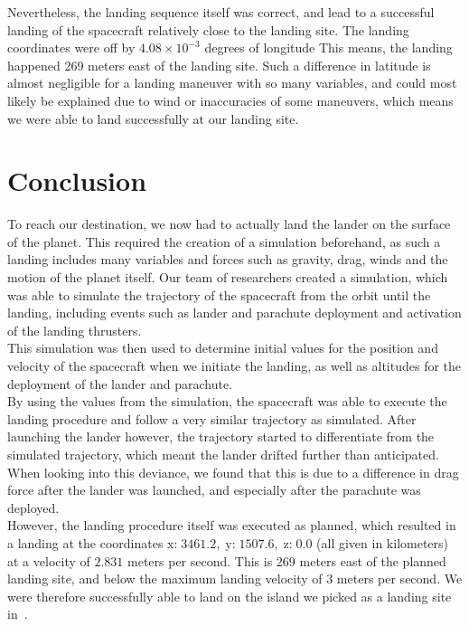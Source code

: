 \documentclass[reprint,english,notitlepage]{revtex4-2}
\begin{document}
Nevertheless, the landing sequence itself was correct, and lead to a successful landing of the spacecraft relatively close to the landing site.
The landing coordinates were off by $4.08 \times 10^{-3}$ degrees of longitude
This means, the landing happened 269 meters east of the landing site.
Such a difference in latitude is almost negligible for a landing maneuver with so many variables, and could most likely be explained due to wind or inaccuracies of some maneuvers, which means we were able to land successfully at our landing site.


\section{Conclusion} \label{sec:conclusion}
To reach our destination, we now had to actually land the lander on the surface of the planet.
This required the creation of a simulation beforehand, as such a landing includes many variables and forces such as gravity, drag, winds and the motion of the planet itself.
Our team of researchers created a simulation, which was able to simulate the trajectory of the spacecraft from the orbit until the landing, including events such as lander and parachute deployment and activation of the landing thrusters.\\

This simulation was then used to determine initial values for the position and velocity of the spacecraft when we initiate the landing, as well as altitudes for the deployment of the lander and parachute.\\

By using the values from the simulation, the spacecraft was able to execute the landing procedure and follow a very similar trajectory as simulated.
After launching the lander however, the trajectory started to differentiate from the simulated trajectory, which meant the lander drifted further than anticipated.
When looking into this deviance, we found that this is due to a difference in drag force after the lander was launched, and especially after the parachute was deployed.\\

However, the landing procedure itself was executed as planned, which resulted in a landing at the coordinates $\text{x:} \;3461.2, \;\text{y:} \;1507.6, \;\text{z:} \;0.0$ (all given in kilometers) at a velocity of $2.831$ meters per second.
This is 269 meters east of the planned landing site, and below the maximum landing velocity of 3 meters per second.
We were therefore successfully able to land on the island we picked as a landing site in~\parencite[][]{part6}.
\end{document}
